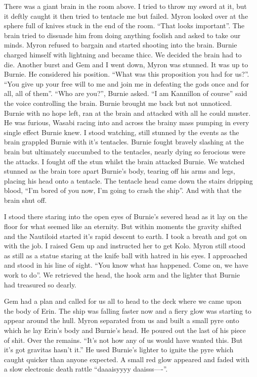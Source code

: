 There was a giant brain in the room above. I tried to throw my sword at it, but it deftly caught it then tried to tentacle me but failed. Myron looked over at the sphere full of knives stuck in the end of the room. “That looks important”. The brain tried to dissuade him from doing anything foolish and asked to take our minds. Myron refused to bargain and started shooting into the brain. Burnie charged himself with lightning and became thicc. We decided the brain had to die. Another burst and Gem and I went down, Myron was stunned. It was up to Burnie. He considered his position. “What was this proposition you had for us?”. “You give up your free will to me and join me in defeating the gods once and for all, all of them”. “Who are you?”, Burnie asked. “I am Kannillon of course” said the voice controlling the brain. Burnie brought me back but not unnoticed. Burnie with no hope left, ran at the brain and attacked with all he could muster. He was furious, Wasabi racing into and across the brainy mass pumping in every single effect Burnie knew. I stood watching, still stunned by the events as the brain grappled Burnie with it’s tentacles. Burnie fought bravely slashing at the brain but ultimately succumbed to the tentacles, nearly dying so ferocious were the attacks. I fought off the stun whilst the brain attacked Burnie. We watched stunned as the brain tore apart Burnie’s body, tearing off his arms and legs, placing his head onto a tentacle. The tentacle head came down the stairs dripping blood, “I’m bored of you now, I’m going to crash the ship”. And with that the brain shut off.\medskip

I stood there staring into the open eyes of Burnie’s severed head as it lay on the floor for what seemed like an eternity. But within moments the gravity shifted and the Nautiloid started it’s rapid descent to earth. I took a breath and got on with the job. I raised Gem up and instructed her to get Kolo. Myron still stood as still as a statue staring at the knife ball with hatred in his eyes. I approached and stood in his line of sight. “You know what has happened. Come on, we have work to do”. We retrieved the head, the hook arm and the lighter that Burnie had treasured so dearly.\medskip

Gem had a plan and called for us all to head to the deck where we came upon the body of Erin. The ship was falling faster now and a fiery glow was starting to appear around the hull. Myron separated from us and built a small pyre onto which he lay Erin’s body and Burnie’s head. He poured out the last of his piece of shit. Over the remains. “It’s not how any of us would have wanted this. But it’s got gravitas hasn’t it.” He used Burnie’s lighter to ignite the pyre which caught quicker than anyone expected. A small red glow appeared and faded with a slow electronic death rattle “daaaisyyyy daaisss—-”.\medskip


